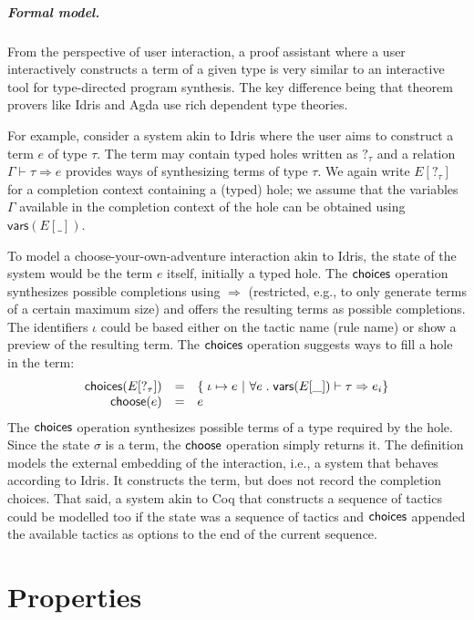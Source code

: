 \documentclass[a4paper,UKenglish,cleveref, autoref, thm-restate]{lipics-v2021}
\newcommand{\ident}[1]{\textsf{#1}}
\newcommand{\select}{\textnormal{\ident{choose}}}
\newcommand{\choices}{\textnormal{\ident{choices}}}
\begin{document}
\subparagraph{Formal model.}
From the perspective of user interaction, a proof assistant where a user interactively constructs
a term of a given type is very similar to an interactive tool for type-directed program synthesis.
The key difference being that theorem provers like Idris and Agda use rich dependent type theories.

For example, consider a system akin to Idris where the user aims to construct a term $e$ of type
$\tau$. The term may contain typed holes written as $?_\tau$ and a relation $\Gamma\vdash \tau\Rightarrow e$
provides ways of synthesizing terms of type $\tau$. We again write $E[?_\tau]$ for a
completion context containing a (typed) hole; we assume that the variables $\Gamma$ available in
the completion context of the hole can be obtained using $\ident{vars}(E[\_])$.

To model a choose-your-own-adventure interaction akin to Idris, the state of the system
would be the term $e$ itself, initially a typed hole. The $\choices$ operation synthesizes
possible completions using $\Rightarrow$ (restricted, e.g., to only generate terms of a certain
maximum size) and offers the resulting terms as possible completions. The identifiers $\iota$
could be based either on the tactic name (rule name) or show a preview of the resulting term.
The $\choices$ operation suggests ways to fill a hole in the term:
\[
\begin{array}{rcl}
\choices(E[?_\tau]) &=& \{\; \iota \mapsto e ~|~ \forall e\;.\; \ident{vars}(E[\_]) \vdash \tau \Rightarrow e_i \}\\
\select(e) &=& e
\end{array}
\]
The $\choices$ operation synthesizes possible terms of a type required by the hole. Since the
state $\sigma$ is a term, the $\select$ operation simply returns it. The definition models the
external embedding of the interaction, i.e., a system that behaves according to Idris. It
constructs the term, but does not record the completion choices. That said, a system akin to Coq
that constructs a sequence of tactics could be modelled too if the state was a sequence of
tactics and $\choices$ appended the available tactics as options to the end of the current sequence.


\newpage

\section{Properties}
\label{sec:properties}
\end{document}
